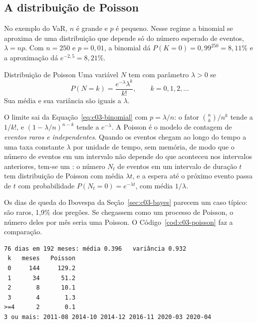 \subsection{A distribuição de Poisson}
\label{sec:c03-poisson}

No exemplo do VaR, $n$ é grande e $p$ é pequeno. Nesse regime a binomial se aproxima de uma distribuição que depende só do número esperado de eventos, $\lambda = np$. Com $n = 250$ e $p = 0,01$, a binomial dá $P(K = 0) = 0,99^{250} = 8,11\%$ e a aproximação dá $e^{-2,5} = 8,21\%$.

\begin{definicao}{Distribuição de Poisson}
Uma variável $N$ tem  com parâmetro $\lambda > 0$ se
\begin{equation}
  P(N = k) = \frac{e^{-\lambda}\lambda^k}{k!} , \qquad k = 0, 1, 2, \dots
  \label{eq:c03-poisson}
\end{equation}
Sua média e sua variância são iguais a $\lambda$.
\end{definicao}

O limite sai da Equação~\eqref{eq:c03-binomial} com $p = \lambda/n$: o fator $\binom{n}{k}/n^k$ tende a $1/k!$, e $(1 - \lambda/n)^{n-k}$ tende a $e^{-\lambda}$. A Poisson é o modelo de contagem de \emph{eventos raros e independentes}. Quando os eventos chegam ao longo do tempo a uma taxa constante $\lambda$ por unidade de tempo, sem memória, de modo que o número de eventos em um intervalo não depende do que aconteceu nos intervalos anteriores, tem-se um : o número $N_t$ de eventos em um intervalo de duração $t$ tem distribuição de Poisson com média $\lambda t$, e a espera até o próximo evento passa de $t$ com probabilidade $P(N_t = 0) = e^{-\lambda t}$, com média $1/\lambda$.

Os dias de queda do Ibovespa da Seção~\ref{sec:c03-bayes} parecem um caso típico: são raros, 1,9\% dos pregões. Se chegassem como um processo de Poisson, o número deles por mês seria uma Poisson. O Código~\ref{cod:c03-poisson} faz a comparação.


\begin{lstlisting}[style=saida]
76 dias em 192 meses: média 0.396   variância 0.932
 k   meses   Poisson
 0     144     129.2
 1      34      51.2
 2       8      10.1
 3       4       1.3
>=4      2       0.1
3 ou mais: 2011-08 2014-10 2014-12 2016-11 2020-03 2020-04
\end{lstlisting}

